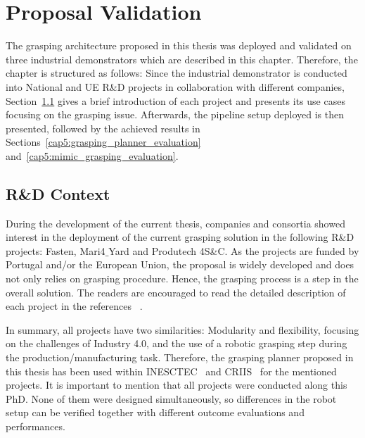 \chapter{Proposal Validation}
\label{cap5:results}

The grasping architecture proposed in this thesis was deployed and validated on three industrial demonstrators which are described in this chapter. Therefore, the chapter is structured as follows: Since the industrial demonstrator is conducted into National and UE R\&D projects in collaboration with different companies, Section~\ref{cap5:red_context} gives a brief introduction of each project and presents its use cases focusing on the grasping issue. Afterwards, the pipeline setup deployed is then presented, followed by the achieved results in Sections~\ref{cap5:grasping_planner_evaluation} and~\ref{cap5:mimic_grasping_evaluation}.


\section{R\&D Context}
\label{cap5:red_context}

During the development of the current thesis, companies and consortia showed interest in the deployment of the current grasping solution in the following R\&D projects: Fasten, Mari4$\_$Yard and Produtech 4S\&C. As the projects are funded by Portugal and/or the European Union, the proposal is widely developed and does not only relies on grasping procedure. Hence, the grasping process is a step in the overall solution. The readers are encouraged to read the detailed description of each project in the references ~\cite{fasten,mari4yard,produtech4sc}.

In summary, all projects have two similarities: Modularity and flexibility, focusing on the challenges of Industry 4.0, and the use of a robotic grasping step during the production/manufacturing task. Therefore, the grasping planner proposed in this thesis has been used within INESCTEC~\cite{inesctec} and CRIIS~\cite{criis} for the mentioned projects. 
It is important to mention that all projects were conducted along this PhD. None of them were designed simultaneously, so differences in the robot setup can be verified together with different outcome evaluations and performances.


